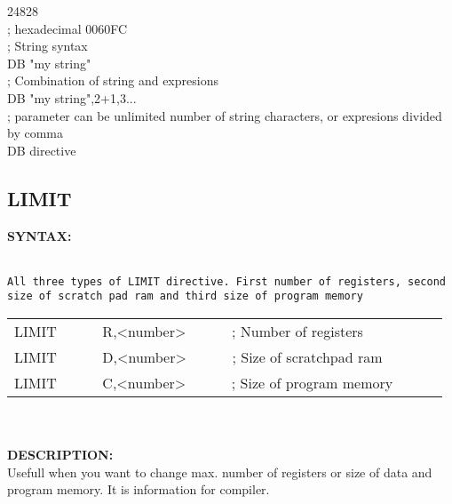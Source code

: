 {\begin{code}[h!]
                                { \color{highlight_symbol}   24828 }\\
                                { \color{highlight_comment} ; hexadecimal 0060FC}\\
                                { \color{highlight_comment} ; String syntax}\\
                                { \color{highlight_directive} DB }
                                { \color{highlight_symbol}   "my string"}\\
                                { \color{highlight_comment} ; Combination of string and expresions}\\
                                { \color{highlight_directive} DB }
                                { \color{highlight_symbol}   "my string",2+1,3...}\\
                                { \color{highlight_comment} ; parameter can be unlimited number of string characters, or expresions divided by comma}\\
                            \caption{DB directive}
                        \end{code}

                \subsection{LIMIT}
                \textbf{SYNTAX:}\\
                \\ {
                        \texttt{All three types of LIMIT directive. First number of registers, second size of scratch pad ram and third size of program memory}
                        \begin{tabular}[h!]{llll}
                                { \color{highlight_directive} LIMIT }   \verb`     `
                                { \color{highlight_symbol} R,<number> }  \verb`     `   { \color{highlight_comment} ; Number of registers }\\
                                { \color{highlight_directive} LIMIT }   \verb`     `
                                { \color{highlight_symbol} D,<number> }  \verb`     `   { \color{highlight_comment} ; Size of scratchpad ram }\\
                                { \color{highlight_directive} LIMIT }  \verb`     `
                                { \color{highlight_symbol} C,<number> }  \verb`     `   { \color{highlight_comment} ; Size of program memory }
                        \end{tabular}
                    }\\
                    \\
                \textbf{DESCRIPTION:}\\
                Usefull when you want to change max. number of registers or size of  data and program memory. It is information for compiler.\\

}

